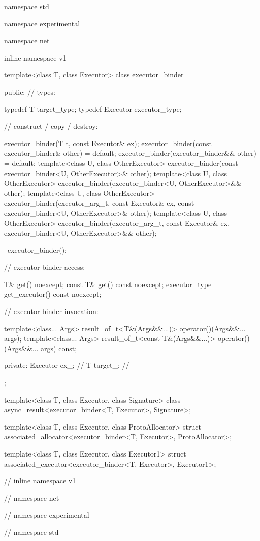 \begin{codeblock}
namespace std {
namespace experimental {
namespace net {
inline namespace v1 {

  template<class T, class Executor>
  class executor_binder
  {
  public:
    // types:

    typedef T target_type;
    typedef Executor executor_type;

    // construct / copy / destroy:

    executor_binder(T t, const Executor& ex);
    executor_binder(const executor_binder& other) = default;
    executor_binder(executor_binder&& other) = default;
    template<class U, class OtherExecutor>
      executor_binder(const executor_binder<U, OtherExecutor>& other);
    template<class U, class OtherExecutor>
      executor_binder(executor_binder<U, OtherExecutor>&& other);
    template<class U, class OtherExecutor>
      executor_binder(executor_arg_t, const Executor& ex,
        const executor_binder<U, OtherExecutor>& other);
    template<class U, class OtherExecutor>
      executor_binder(executor_arg_t, const Executor& ex,
        executor_binder<U, OtherExecutor>&& other);

    ~executor_binder();

    // executor binder access:

    T& get() noexcept;
    const T& get() const noexcept;
    executor_type get_executor() const noexcept;

    // executor binder invocation:

    template<class... Args>
      result_of_t<T&(Args&&...)> operator()(Args&&... args);
    template<class... Args>
      result_of_t<const T&(Args&&...)> operator()(Args&&... args) const;

  private:
    Executor ex_; // \expos
    T target_; // \expos
  };

  template<class T, class Executor, class Signature>
    class async_result<executor_binder<T, Executor>, Signature>;

  template<class T, class Executor, class ProtoAllocator>
    struct associated_allocator<executor_binder<T, Executor>, ProtoAllocator>;

  template<class T, class Executor, class Executor1>
    struct associated_executor<executor_binder<T, Executor>, Executor1>;

} // inline namespace v1
} // namespace net
} // namespace experimental
} // namespace std
\end{codeblock}



